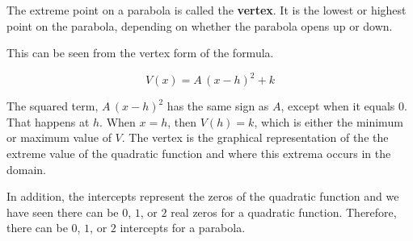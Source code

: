 \documentclass{ximera}
\begin{document}
\begin{image}
\end{image}










The extreme point on a parabola is called the \textbf{vertex}.  It is the lowest or highest point on the parabola, depending on whether the parabola opens up or down. 

This can be seen from the vertex form of the formula.




\[
V(x) = A \, (x - h)^2 + k
\]

The squared term, $A \, (x - h)^2$ has the same sign as $A$, except when it equals $0$.  That happens at $h$.  When $x = h$, then $V(h) = k$, which is either the minimum or maximum value of $V$.  The vertex is the graphical representation of the the extreme value of the quadratic function and where this extrema occurs in the domain.


In addition, the intercepts represent the zeros of the quadratic function and we have seen there can be $0$, $1$, or $2$ real zeros for a quadratic function.  Therefore, there can be $0$, $1$, or $2$ intercepts for a parabola.
\end{document}
